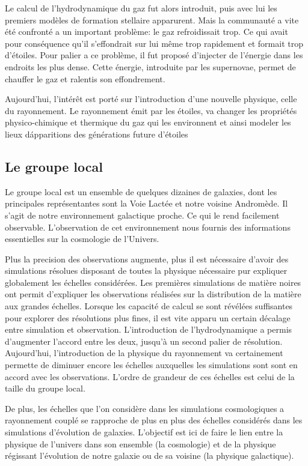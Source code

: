 Le calcul de l'hydrodynamique du gaz fut alors introduit, puis avec lui les premiers modèles de formation stellaire apparurent.
Mais la communauté a vite été confronté a un important problème: le gaz refroidissait trop.
Ce qui avait pour conséquence qu'il s'effondrait sur lui même trop rapidement et formait trop d'étoiles.
Pour palier a ce problème, il fut proposé d'injecter de l'énergie dans les endroits les plus dense.
Cette énergie, introduite par les supernovae, permet de chauffer le gaz et ralentis son effondrement. 

Aujourd'hui, l'intérêt est porté sur l'introduction d'une nouvelle physique, celle du rayonnement.
Le rayonnement émit par les étoiles, va changer les propriétés physico-chimique et thermique du gaz qui les environnent et ainsi modeler les lieux d\'apparitions des générations future d'étoiles


\subsection*{Le groupe local}
Le groupe local est un ensemble de quelques dizaines de galaxies, dont les principales représentantes sont la Voie Lactée et notre voisine Andromède.
Il s'agit de notre environnement galactique proche.
Ce qui le rend facilement observable.
L'observation de cet environnement nous fournis des informations essentielles sur la cosmologie de l'Univers.

Plus la precision des observations augmente, plus il est nécessaire d'avoir des simulations résolues disposant de toutes la physique nécessaire pur expliquer globalement les échelles considérées.
Les premières simulations de matière noires ont permit d'expliquer les observations réalisées sur la distribution de la matière aux grandes échelles.
Lorsque les capacité de calcul se sont révélées suffisantes pour explorer des résolutions plus fines, il est vite apparu un certain décalage entre simulation et observation. 
L'introduction de l'hydrodynamique a permis d'augmenter l'accord entre les deux, jusqu'à un second palier de résolution.
Aujourd'hui, l'introduction de la physique du rayonnement va certainement permette de diminuer encore les échelles auxquelles les simulations sont sont en accord avec les observations.
L'ordre de grandeur de ces échelles est celui de la taille du groupe local.

De plus, les échelles que l'on considère dans les simulations cosmologiques a rayonnement couplé se rapproche de plus en plus des échelles considérés dans les simulations d'évolution de galaxies.
L'objectif est ici de faire le lien entre la physique de l'univers dans son ensemble (la cosmologie) et de la physique régissant l'évolution de notre galaxie ou de sa voisine (la physique galactique).






